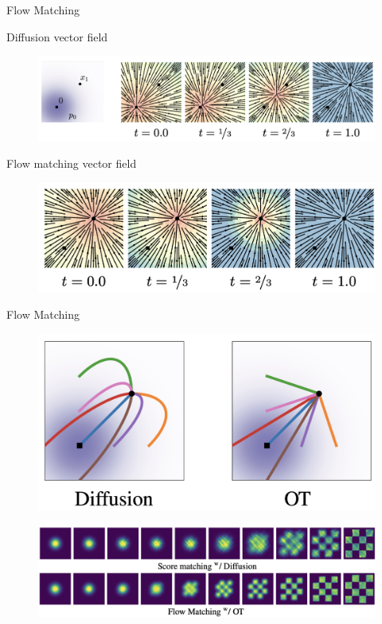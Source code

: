 \begin{frame}{Flow Matching}
	\begin{block}{Diffusion vector field}
		\begin{figure}
			\centering
			\includegraphics[width=\linewidth]{figs/diff_cond_path}
		\end{figure}
	\end{block}
	\begin{block}{Flow matching vector field}
		\begin{figure}
			\raggedleft
			\includegraphics[width=0.77\linewidth]{figs/ot_cond_path}
		\end{figure}
	\end{block}
\end{frame}
\begin{frame}{Flow Matching}
	\begin{figure}
		\centering
		\includegraphics[width=0.7\linewidth]{figs/trajectories}
	\end{figure}
	\begin{figure}
		\centering
		\includegraphics[width=\linewidth]{figs/2d-generation}
	\end{figure}
\end{frame}
